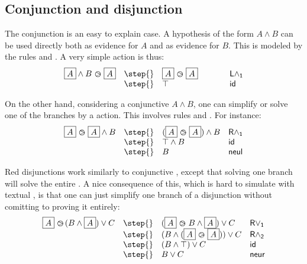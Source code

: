 \subsection{Conjunction and disjunction}
The conjunction is an easy to explain case. A hypothesis of the form
$A\land B$ can be used directly both as evidence for $A$ and as evidence
for $B$. This is modeled by the rules  and
. A very simple action is thus:
$$
\begin{array}{llll}
  \select{A}\land B \back \select{A} & \step{}& \select{A} \back
  \select{A} \hbox to 1cm {\hfil}&\mathsf{L \land_1}\\
                                       & \step{} &\top & \mathsf{id}
\end{array}
$$

On the other hand, considering a conjunctive  $A\land B$, one can
simplify or solve one of the branches by a  action. This involves
rules  and
. For instance:
$$
\begin{array}{llll}
  \select{A} \back \select{A}\land B &
                                         \step{}& (\select{A} \back
                                         \select{A})\land B &\mathsf{R \land_1}\\
                                       & \step{}& \top \land B  & \mathsf{id}\\
  &\step{}& B&\mathsf{neul}
\end{array}
$$

Red disjunctions work similarly to conjunctive , except that solving one
branch will solve the entire . A nice consequence of this, which is hard to
simulate with textual , is that one can just simplify one branch of a
disjunction without comitting to proving it entirely:
$$
\begin{array}{llll}
  \select{A} \back (B \land \select{A}) \lor C
    & \step{} & (\select{A} \back B \land \select{A}) \lor C &\mathsf{R\lor_1}\\
    & \step{} & (B \land (\select{A} \back \select{A})) \lor C &\mathsf{R\land_2}\\
    & \step{} & (B \land \top) \lor C &\mathsf{id}\\
    & \step{} & B \lor C &\mathsf{neur}
\end{array}
$$

